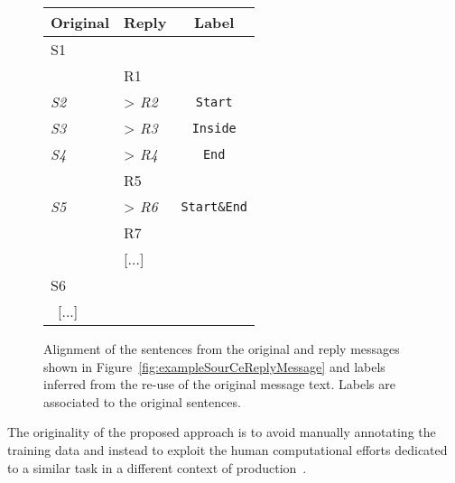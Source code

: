 \begin{figure}
\begin{minipage}{.58\textwidth}
        \caption{An original message and its reply (\textit{ubuntu-users} email archive). Sentences have been tagged to facilitate the discussion. %
        }\label{fig:exampleSourCeReplyMessage}
\end{minipage}
\hfill
\begin{minipage}{.55\textwidth}
\small\centering
\begin{tabular}{*{2}{|l}|c|}
\toprule
\textbf{Original} & \textbf{Reply} & \textbf{Label}\\
    \midrule
S1  & & \\
    & R1 & \\
\textit{S2}  & > \textit{R2}& \texttt{Start}\\
\textit{S3}  & > \textit{R3}& \texttt{Inside}\\
\textit{S4}  & > \textit{R4}& \texttt{End}\\
    & R5 & \\
\textit{S5}  & > \textit{R6} & \texttt{Start\&End}\\
    & R7 & \\
    & [...] & \\
S6    &  & \\ \ 
[...] \    &  & \\
    \bottomrule
\end{tabular}
\caption{Alignment of the sentences from the original and reply messages shown in Figure~\ref{fig:exampleSourCeReplyMessage} and labels inferred from the re-use of the original message text. Labels are associated to the original sentences.}
\label{fig:exampleSegmentationLabels}
\end{minipage}
\end{figure}
%
The originality of the proposed approach is to avoid manually annotating the training data and instead to exploit the human computational efforts dedicated to a similar task in a different context of production~\cite{ahn:2006:computer}. 
